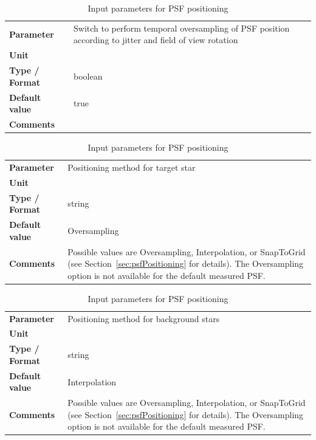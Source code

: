 \documentclass[11pt]{article}      %
\def\HCode#1{}
\def\htmlanchor#1{\HCode{<a id="#1"></a>}}
\begin{document}
\begin{table}[hb]
  \caption{Input parameters for PSF positioning}

  \htmlanchor{oversampleJitter}
  \begin{tabular}{| l | p{13cm} |}
    \hline 
    {\bf Parameter} & Switch to perform temporal oversampling of PSF position according to jitter and field of view rotation\\
    {\bf Unit} & \\
    {\bf Type / Format} & boolean\\
    {\bf Default value} & true\\
    {\bf Comments} & \\
    \hline
  \end{tabular}
  \bigskip

  \htmlanchor{targetStarPositioning}
  \begin{tabular}{| l | p{13cm} |}
    \hline 
    {\bf Parameter} & Positioning method for target star\\
    {\bf Unit} & \\
    {\bf Type / Format} & string\\
    {\bf Default value} & Oversampling\\
    {\bf Comments} & Possible values are Oversampling, Interpolation, or SnapToGrid (see Section~\ref{sec:psfPositioning} for details). The Oversampling option is not available for the default measured PSF.\\
    \hline
  \end{tabular}
  \bigskip

  \htmlanchor{backgroundStarPositioning}
  \begin{tabular}{| l | p{13cm} |}
    \hline 
    {\bf Parameter} & Positioning method for background stars\\
    {\bf Unit} & \\
    {\bf Type / Format} & string\\
    {\bf Default value} & Interpolation\\
    {\bf Comments} & Possible values are Oversampling, Interpolation, or SnapToGrid (see Section~\ref{sec:psfPositioning} for details). The Oversampling option is not available for the default measured PSF.\\
    \hline
  \end{tabular}
  \bigskip

  \label{tab:psfpos}
\end{table}

\clearpage
\htmlanchor{HaloGenerator}
\end{document}
